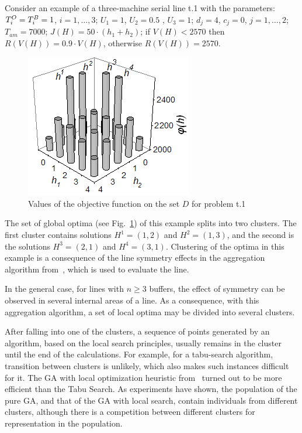 \documentclass{ifacconf}
\begin{document}
Consider an example of a three-machine serial line t.1 
with the parameters: ${T^{\rm O}_i=T^{\rm B}_i=1}$, $i = 1,\ldots,3$;
 ${U_1=1}$, ${U_2=0.5}$ , ${U_3=1}$;
 ${d_j=4}$, ${c_j=0}$, $j = 1,\ldots,2$;
 $T_{am}=7000$;
 $J(H)=50\cdot(h_1+h_2)$;
 if $V(H) < 2570$ then $R(V(H))=0.9\cdot V(H)$, otherwise $R(V(H))=2570$.

 \begin{figure}[h!]
	\centering
	\includegraphics[scale=0.7]{test}
	\vspace{-1em}
  \caption{Values of the objective function on the set $D$ for problem t.1\label{t_1}}
  \end{figure}

The set of global optima (see Fig.~\ref{t_1}) of this example splits into two clusters. The
first cluster contains solutions $H^1=(1,2)$ and $H^2=(1,3)$, and
the second is the solutions $H^3=(2,1)$ and $H^4=(3,1)$. Clustering of the optima in
this example is a consequence of the line symmetry effects
in the aggregation algorithm from~\cite{Dolgui93, DF}, which is used to evaluate the line.

In the general case, for lines with $n\geq 3$ buffers, the effect of
symmetry can be observed in several internal areas of a
line. As a consequence, with this aggregation algorithm, a
set of local optima may be divided into several clusters.

After falling into one of the clusters, a sequence of points generated by an algorithm, based on the local search principles,  usually
 remains in the cluster until the end of the calculations. For example, for a tabu-search algorithm, transition between clusters is unlikely, 
 which also makes such instances difficult for it. 
The GA with local optimization heuristic from~\cite{sHBBA2007} turned out to be more efficient than the Tabu Search. 
As experiments have shown, the population of the pure GA, and that of the GA with local search, contain individuals from different clusters,
although there is a competition between different clusters for representation in the population.
\end{document}
